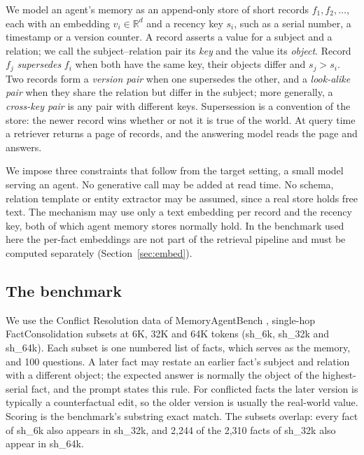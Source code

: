 \documentclass[journal=jcisd8,manuscript=article]{achemso}
\newcommand{\sub}[1]{\textsf{sh\_#1}}                    %
\begin{document}
We model an agent's memory as an append-only store of short records $f_1,f_2,\dots$, each with an embedding $v_i\in\mathbb{R}^d$ and a recency key $s_i$, such as a serial number, a timestamp or a version counter. A record asserts a value for a subject and a relation; we call the subject--relation pair its \emph{key} and the value its \emph{object}. Record $f_j$ \emph{supersedes} $f_i$ when both have the same key, their objects differ and $s_j>s_i$. Two records form a \emph{version pair} when one supersedes the other, and a \emph{look-alike pair} when they share the relation but differ in the subject; more generally, a \emph{cross-key pair} is any pair with different keys. Supersession is a convention of the store: the newer record wins whether or not it is true of the world. At query time a retriever returns a page of records, and the answering model reads the page and answers.

We impose three constraints that follow from the target setting, a small model serving an agent. No generative call may be added at read time. No schema, relation template or entity extractor may be assumed, since a real store holds free text. The mechanism may use only a text embedding per record and the recency key, both of which agent memory stores normally hold. In the benchmark used here the per-fact embeddings are not part of the retrieval pipeline and must be computed separately (Section~\ref{sec:embed}).

\subsection{The benchmark}
\label{sec:benchmark}

We use the Conflict Resolution data of MemoryAgentBench \cite{hu2026memoryagentbench}, single-hop FactConsolidation subsets at 6K, 32K and 64K tokens (\sub{6k}, \sub{32k} and \sub{64k}). Each subset is one numbered list of facts, which serves as the memory, and 100 questions. A later fact may restate an earlier fact's subject and relation with a different object; the expected answer is normally the object of the highest-serial fact, and the prompt states this rule. For conflicted facts the later version is typically a counterfactual edit, so the older version is usually the real-world value. Scoring is the benchmark's substring exact match. The subsets overlap: every fact of \sub{6k} also appears in \sub{32k}, and 2,244 of the 2,310 facts of \sub{32k} also appear in \sub{64k}.
\end{document}
